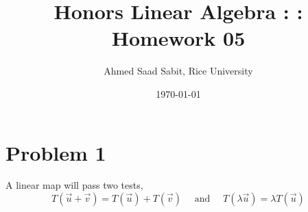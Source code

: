 \documentclass[letter]{article}
\title{Honors Linear Algebra : : Homework 05}
\author{Ahmed Saad Sabit, Rice University}
\date{\today}
\begin{document}
\maketitle

\section*{Problem 1}
A linear map will pass two tests, 
\[
T(\vec{u}+\vec{v}) = T(\vec{u})+T(\vec{v}) \quad \text{ and } \quad 
T(\lambda \vec{u}) = \lambda T(\vec{u})
\] 
\end{document}
